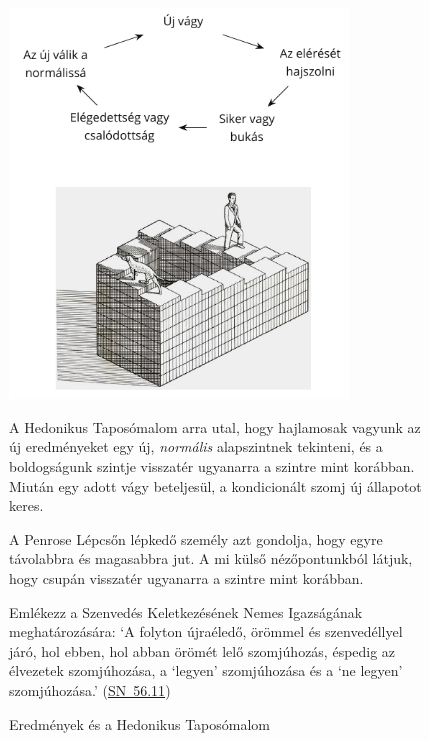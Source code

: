 \begin{figure}[h]
\vspace*{-15pt}
\caption{Eredmények és a Hedonikus Taposómalom}\label{fig-hedonic-treadmill}

\centering

\includegraphics[width=90mm]{./manuscript/tex/diagrams/hedonic-treadmill-stairs-hu.pdf}

\bigskip

\begin{minipage}{0.85\linewidth}
\centering\footnotesize

A Hedonikus Taposómalom arra utal,
hogy hajlamosak vagyunk az új eredményeket egy új, \emph{normális} alapszintnek tekinteni,
és a boldogságunk szintje visszatér ugyanarra a szintre mint korábban.
Miután egy adott vágy beteljesül, a kondicionált szomj új állapotot keres.

\bigskip

A Penrose Lépcsőn lépkedő személy azt gondolja,
hogy egyre távolabbra és magasabbra jut.
A mi külső nézőpontunkból látjuk,
hogy csupán visszatér ugyanarra a szintre mint korábban.

\bigskip

Emlékezz a Szenvedés Keletkezésének Nemes Igazságának meghatározására:
`A folyton újraéledő, örömmel és szenvedéllyel járó, hol ebben, hol abban örömét lelő szomjúhozás, éspedig az élvezetek szomjúhozása, a ‘legyen’ szomjúhozása és a ‘ne legyen’ szomjúhozása.'
(\href{https://a-buddha-ujja.hu/sn-56.11/hu/a-pali-fordito-csoport}{SN~56.11})

\end{minipage}

\end{figure}

